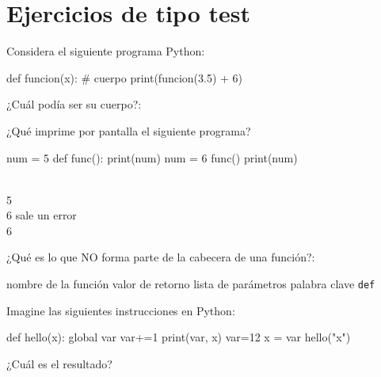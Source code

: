 \section*{Ejercicios de tipo test}\label{ejercicios_tipo_test}

\begin{ejercicio}
Considera el siguiente programa Python:

\begin{python}
def funcion(x):
  # cuerpo
print(funcion(3.5) + 6)
\end{python}

¿Cuál podía ser su cuerpo?:

\begin{choices}
    \choice {}
    \choice {}
    \choice {} %
    \choice {}
\end{choices}
\end{ejercicio}


\begin{ejercicio}
¿Qué imprime por pantalla el siguiente programa?

\begin{python}
num = 5
def func():
     print(num)
     num = 6
func()
print(num)
\end{python}


\begin{choices}
     \\ 5
     \\ 6
    \choice sale un error %
     \\ 6
\end{choices}

\end{ejercicio}

\begin{ejercicio}  ¿Qué es lo que NO forma parte de la cabecera de una función?:

\begin{choices}
    \choice nombre de la función
    \choice valor de retorno   %
    \choice lista de parámetros
    \choice palabra clave \texttt{def}
\end{choices}
\end{ejercicio}


\begin{ejercicio} 
Imagine las siguientes instrucciones en Python:

\begin{python}
def hello(x):
    global var
    var+=1
    print(var, x)
var=12
x = var
hello("x")
\end{python}

¿Cuál es el resultado?

\begin{choices}
    \choice {} %
    \choice {}
    \choice {}
    \choice {}
\end{choices}

\end{ejercicio}


